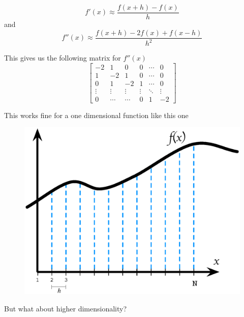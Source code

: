 \documentclass{beamer}
\begin{document}
\begin{frame}
$$f'(x) \approx \frac{f(x + h) - f(x)}{h}$$
and 
$$f''(x) \approx \frac{f(x + h) - 2f(x) + f(x - h)}{h^2}$$
\end{frame}

\begin{frame}
This gives us the following matrix for $f''(x)$
\begin{equation}
\begin{bmatrix}
                -2     &   1    &     0    &     0   & \cdots & 0 \\
                1      &  -2    &     1    &     0   & \cdots & 0 \\
                0      &   1    &    -2    &     1   & \cdots & 0 \\
                \vdots & \vdots &   \vdots & \vdots  & \ddots & \vdots \\
                0      & \cdots &    \cdots     &     0   &    1   & -2
              \end{bmatrix}  \nonumber
\end{equation}
\end{frame}

\begin{frame}
This works fine for a one dimensional function like this one
\begin{figure}[h]
  \centering
  \includegraphics[scale=0.3]{figures/sampledFunc3.eps}
\end{figure}

But what about higher dimensionality?
\end{frame}
\end{document}
